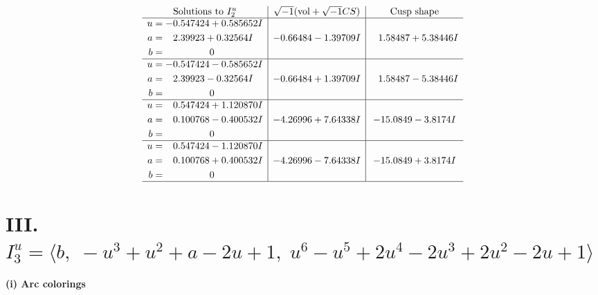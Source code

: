 \documentclass[1p]{elsarticle_modified}
\theoremstyle{definition}
\newcommand{\I}{\sqrt{-1}}
\begin{document}
$$\begin{array}{c|c|c}  
\text{Solutions to }I^u_{2}& \I (\text{vol} + \sqrt{-1}CS) & \text{Cusp shape}\\
 \hline 
\begin{aligned}
u &= -0.547424 + 0.585652 I \\
a &= \phantom{-}2.39923 + 0.32564 I \\
b &= \phantom{-0.000000 } 0\end{aligned}
 & -0.66484 - 1.39709 I & \phantom{-}1.58487 + 5.38446 I \\ \hline\begin{aligned}
u &= -0.547424 - 0.585652 I \\
a &= \phantom{-}2.39923 - 0.32564 I \\
b &= \phantom{-0.000000 } 0\end{aligned}
 & -0.66484 + 1.39709 I & \phantom{-}1.58487 - 5.38446 I \\ \hline\begin{aligned}
u &= \phantom{-}0.547424 + 1.120870 I \\
a &= \phantom{-}0.100768 - 0.400532 I \\
b &= \phantom{-0.000000 } 0\end{aligned}
 & -4.26996 + 7.64338 I & -15.0849 - 3.8174 I \\ \hline\begin{aligned}
u &= \phantom{-}0.547424 - 1.120870 I \\
a &= \phantom{-}0.100768 + 0.400532 I \\
b &= \phantom{-0.000000 } 0\end{aligned}
 & -4.26996 - 7.64338 I & -15.0849 + 3.8174 I\\
 \hline 
 \end{array}$$\newpage\newpage\renewcommand{\arraystretch}{1}
\centering \section*{III. $I^u_{3}= \langle b,\;- u^3+u^2+a-2 u+1,\;u^6- u^5+2 u^4-2 u^3+2 u^2-2 u+1 \rangle$}
\flushleft \textbf{(i) Arc colorings}\\
\end{document}

